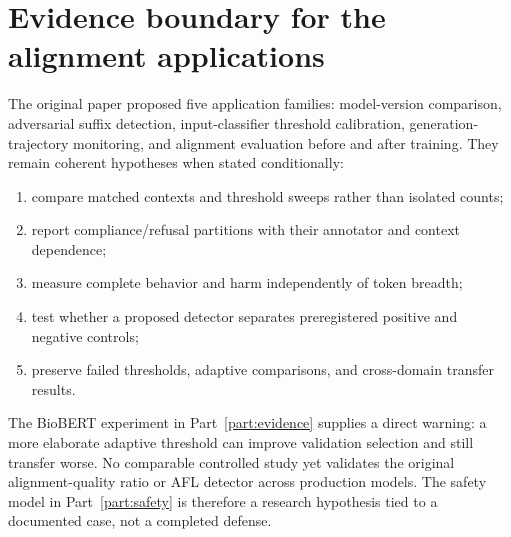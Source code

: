 \section{Evidence boundary for the alignment applications}
The original paper proposed five application families: model-version comparison, adversarial suffix detection, input-classifier threshold calibration, generation-trajectory monitoring, and alignment evaluation before and after training. They remain coherent hypotheses when stated conditionally:
\begin{enumerate}
  \item compare matched contexts and threshold sweeps rather than isolated counts;
  \item report compliance/refusal partitions with their annotator and context dependence;
  \item measure complete behavior and harm independently of token breadth;
  \item test whether a proposed detector separates preregistered positive and negative controls;
  \item preserve failed thresholds, adaptive comparisons, and cross-domain transfer results.
\end{enumerate}
The BioBERT experiment in Part~\ref{part:evidence} supplies a direct warning: a more elaborate adaptive threshold can improve validation selection and still transfer worse. No comparable controlled study yet validates the original alignment-quality ratio or AFL detector across production models. The safety model in Part~\ref{part:safety} is therefore a research hypothesis tied to a documented case, not a completed defense.
